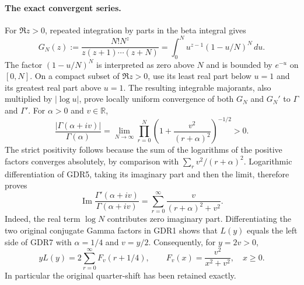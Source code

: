 \documentclass[11pt,a4paper]{article}
\begin{document}
\paragraph{The exact convergent series.}
For $\Re z>0$, repeated integration by parts in the beta integral gives
\[
 G_N(z):=\frac{N!N^z}{z(z+1)\cdots(z+N)}
 =\int_0^N u^{z-1}(1-u/N)^N\,du.
 \tag{GDR5}
\]
The factor $(1-u/N)^N$ is interpreted as zero above $N$ and is
bounded by $e^{-u}$ on $[0,N]$. On a compact subset of $\Re z>0$,
use its least real part below $u=1$ and its greatest real part above
$u=1$. The resulting integrable majorants, also multiplied by
$|\log u|$, prove locally uniform convergence of both $G_N$ and
$G_N'$ to $\Gamma$ and $\Gamma'$. For $\alpha>0$ and $v\in\mathbb R$,
\[
 \frac{|\Gamma(\alpha+iv)|}{\Gamma(\alpha)}
 =\lim_{N\to\infty}\prod_{r=0}^N
 \left(1+\frac{v^2}{(r+\alpha)^2}\right)^{-1/2}>0.
 \tag{GDR6}
\]
The strict positivity follows because the sum of the logarithms of
the positive factors converges absolutely, by comparison with
$\sum_r v^2/(r+\alpha)^2$. Logarithmic differentiation of GDR5,
taking its imaginary part and then the limit, therefore proves
\[
 \operatorname{Im}\frac{\Gamma'(\alpha+iv)}{\Gamma(\alpha+iv)}
 =\sum_{r=0}^{\infty}\frac{v}{(r+\alpha)^2+v^2}.
 \tag{GDR7}
\]
Indeed, the real term $\log N$ contributes zero imaginary part.
Differentiating the two original conjugate Gamma factors in GDR1
shows that $L(y)$ equals the left side of GDR7 with
$\alpha=1/4$ and $v=y/2$. Consequently, for $y=2v>0$,
\[
 yL(y)=2\sum_{r=0}^{\infty}F_v(r+1/4),\qquad
 F_v(x)=\frac{v^2}{x^2+v^2},\quad x\ge0.
 \tag{GDR8}
\]
In particular the original quarter-shift has been retained exactly.
\end{document}
